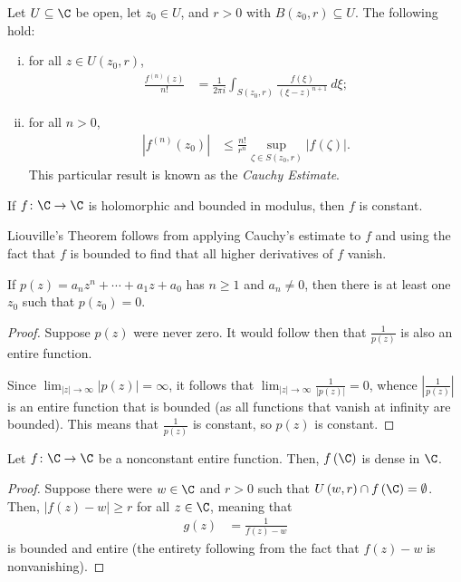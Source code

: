 \documentclass[10pt]{mypackage}
\begin{document}
\begin{corollary}
  Let $U\subseteq \C$ be open, let $z_0\in U$, and $r > 0$ with $B\left( z_0,r \right)\subseteq U$. The following hold:
  \begin{enumerate}[(i)]
    \item for all $z\in U\left( z_0,r \right)$,
      \begin{align*}
        \frac{f^{(n)}\left(z\right)}{n!} &= \frac{1}{2\pi i} \int_{S\left( z_0,r \right)}^{} \frac{f\left( \xi \right)}{\left( \xi-z \right)^{n+1}}\:d\xi;
      \end{align*}
    \item for all $n  > 0$,
      \begin{align*}
        \left\vert f^{(n)}\left( z_0 \right) \right\vert &\leq \frac{n!}{r^{n}} \sup_{\zeta\in S\left( z_0,r \right)} \left\vert f\left(\zeta\right) \right\vert.
      \end{align*}
      This particular result is known as the \textit{Cauchy Estimate}.
  \end{enumerate}
\end{corollary}
\begin{theorem}
  If $f\colon \C\rightarrow \C$ is holomorphic and bounded in modulus, then $f$ is constant.
\end{theorem}
Liouville's Theorem follows from applying Cauchy's estimate to $f$ and using the fact that $f$ is bounded to find that all higher derivatives of $f$ vanish.
\begin{theorem}
  If $p(z) = a_nz^{n} + \cdots + a_1 z + a_0$ has $n\geq 1$ and $a_n\neq 0$, then there is at least one $z_0$ such that $p\left( z_0 \right) = 0$.
\end{theorem}
\begin{proof}
  Suppose $p(z)$ were never zero. It would follow then that $\frac{1}{p(z)}$ is also an entire function.%
  
  Since $\lim_{|z|\rightarrow\infty}\left\vert p(z) \right\vert = \infty$, it follows that $\lim_{|z|\rightarrow\infty} \frac{1}{\left\vert p(z) \right\vert} = 0$, whence $ \left\vert \frac{1}{p(z)} \right\vert $ is an entire function that is bounded (as all functions that vanish at infinity are bounded). This means that $ \frac{1}{p(z)} $ is constant, so $p(z)$ is constant.
\end{proof}
\begin{corollary}
  Let $f\colon \C\rightarrow \C$ be a nonconstant entire function. Then, $f\left(\C\right)$ is dense in $\C$.
\end{corollary}
\begin{proof}
  Suppose there were $w\in\C$ and $r > 0$ such that $U\left( w,r \right)\cap f\left( \C \right) = \emptyset$. Then, $\left\vert f(z)-w \right\vert \geq r$ for all $z\in \C$, meaning that
  \begin{align*}
    g(z) &= \frac{1}{f(z)-w}
  \end{align*}
  is bounded and entire (the entirety following from the fact that $f(z)-w$ is nonvanishing).
\end{proof}
\end{document}
